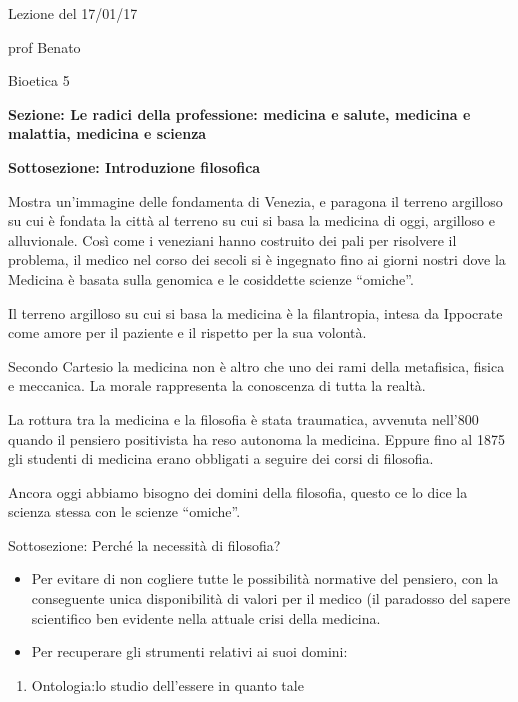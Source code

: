 \documentclass[]{article}
\date{}
\begin{document}
Lezione del 17/01/17

prof Benato

Bioetica 5

\textbf{Sezione: Le radici della professione: medicina e salute,
medicina e malattia, medicina e scienza}

\textbf{Sottosezione: Introduzione filosofica}

Mostra un'immagine delle fondamenta di Venezia, e paragona il terreno
argilloso su cui è fondata la città al terreno su cui si basa la
medicina di oggi, argilloso e alluvionale. Così come i veneziani hanno
costruito dei pali per risolvere il problema, il medico nel corso dei
secoli si è ingegnato fino ai giorni nostri dove la Medicina è basata
sulla genomica e le cosiddette scienze ``omiche''.

Il terreno argilloso su cui si basa la medicina è la filantropia, intesa
da Ippocrate come amore per il paziente e il rispetto per la sua
volontà.

Secondo Cartesio la medicina non è altro che uno dei rami della
metafisica, fisica e meccanica. La morale rappresenta la conoscenza di
tutta la realtà.

La rottura tra la medicina e la filosofia è stata traumatica, avvenuta
nell'800 quando il pensiero positivista ha reso autonoma la medicina.
Eppure fino al 1875 gli studenti di medicina erano obbligati a seguire
dei corsi di filosofia.

Ancora oggi abbiamo bisogno dei domini della filosofia, questo ce lo
dice la scienza stessa con le scienze ``omiche''.

Sottosezione: Perché la necessità di filosofia?

\begin{itemize}
\item
  Per evitare di non cogliere tutte le possibilità normative del
  pensiero, con la conseguente unica disponibilità di valori per il
  medico (il paradosso del sapere scientifico ben evidente nella attuale
  crisi della medicina.
\end{itemize}

\begin{itemize}
\item
  Per recuperare gli strumenti relativi ai suoi domini:
\end{itemize}

\begin{enumerate}
\def\labelenumi{\arabic{enumi}.}
\item
  Ontologia:lo studio dell'essere in quanto tale
\end{enumerate}
\end{document}
